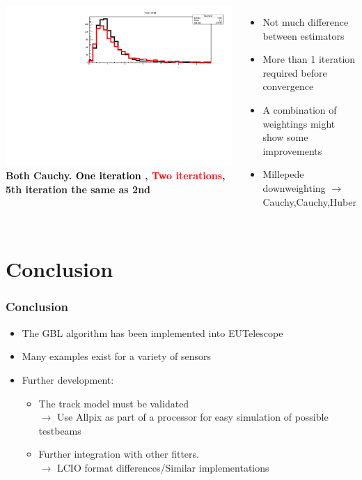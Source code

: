 \documentclass{beamer}
\begin{document}
\begin{frame}
\begin{columns}[t]
\includegraphics[width=1.1\linewidth]{pics/cauchy_1_2_5Iter.pdf}\\ 
\tiny{\textbf{Both Cauchy.  \textcolor{black}{One iteration} , \textcolor{red}{Two iterations}, 5th iteration the same as 2nd}}\\
\begin{itemize}
\item Not much difference between estimators 
\item More than 1 iteration required before convergence
\item A combination of weightings might show some improvements
\item Millepede downweighting $\rightarrow$ Cauchy,Cauchy,Huber
\end{itemize}
\end{columns}
\vspace{5pt}
\end{frame}

\section{Conclusion}
\begin{frame}
\frametitle{Conclusion}
\begin{itemize}
\item The GBL algorithm has been implemented into EUTelescope
\item Many examples exist for a variety of sensors 
\item Further development:
\begin{itemize}
\item The track model must be validated\\  $\rightarrow$ Use Allpix as part of a processor for easy simulation of possible testbeams 
\item Further integration with other fitters. \\$\rightarrow$ LCIO format differences/Similar implementations  
\end{itemize} 
\end{itemize}

\end{frame}
\end{document}
